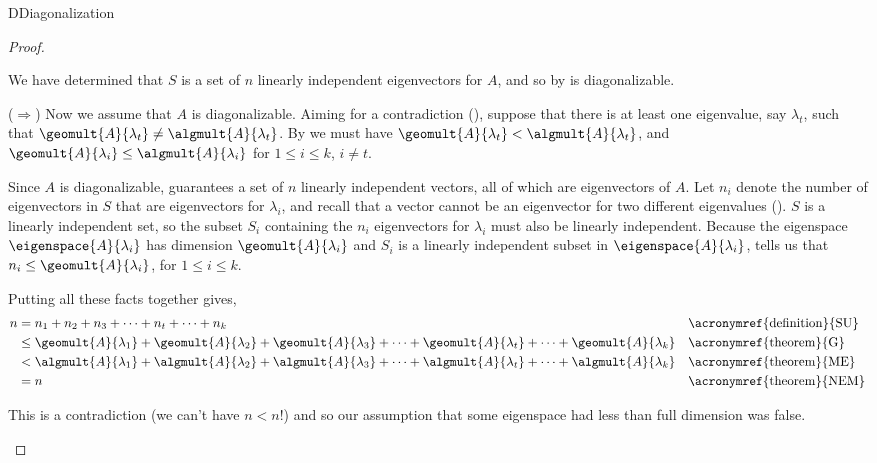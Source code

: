 \begin{subsect}{D}{Diagonalization}
\begin{proof}
%
\begin{para}We have determined that $S$ is a set of $n$ linearly independent eigenvectors for $A$, and so by  is diagonalizable.\end{para}
%
\begin{para}($\Rightarrow$)  Now we assume that $A$ is diagonalizable.  Aiming for a contradiction (), suppose that there is at least one eigenvalue, say $\lambda_t$, such that $\geomult{A}{\lambda_t}\neq\algmult{A}{\lambda_t}$.  By  we must have $\geomult{A}{\lambda_t}<\algmult{A}{\lambda_t}$, and $\geomult{A}{\lambda_i}\leq\algmult{A}{\lambda_i}$ for $1\leq i\leq k$, $i\neq t$.\end{para}
%
\begin{para}Since $A$ is diagonalizable,  guarantees a set of $n$ linearly independent vectors, all of which are eigenvectors of $A$.  Let $n_i$ denote the number of eigenvectors in $S$ that are eigenvectors for $\lambda_i$, and recall that a vector cannot be an eigenvector for two different eigenvalues ().  $S$ is a linearly independent set, so the subset $S_i$ containing the $n_i$ eigenvectors for $\lambda_i$ must also be linearly independent.  Because the eigenspace $\eigenspace{A}{\lambda_i}$ has dimension $\geomult{A}{\lambda_i}$ and $S_i$ is a linearly independent subset in $\eigenspace{A}{\lambda_i}$,  tells us that $n_i\leq\geomult{A}{\lambda_i}$, for $1\leq i\leq k$.\end{para}
%
\begin{para}Putting all these facts together gives,
%
\begin{align*}
n
&=n_1+n_2+n_3+\cdots+n_t+\cdots+n_k
&&\text{\acronymref{definition}{SU}}\\
%
&\leq\geomult{A}{\lambda_1}+\geomult{A}{\lambda_2}+\geomult{A}{\lambda_3}+\cdots+\geomult{A}{\lambda_t}+\cdots+\geomult{A}{\lambda_k}
&&\text{\acronymref{theorem}{G}}\\
%
&<\algmult{A}{\lambda_1}+\algmult{A}{\lambda_2}+\algmult{A}{\lambda_3}+\cdots+\algmult{A}{\lambda_t}+\cdots+\algmult{A}{\lambda_k}&&\text{\acronymref{theorem}{ME}}\\
%
&=n
&&\text{\acronymref{theorem}{NEM}}
%
\end{align*}
\end{para}
%
\begin{para}This is a contradiction
(we can't have $n<n$!)
and so our assumption that some eigenspace had less than full dimension was false.\end{para}

\end{proof}
\end{subsect}
